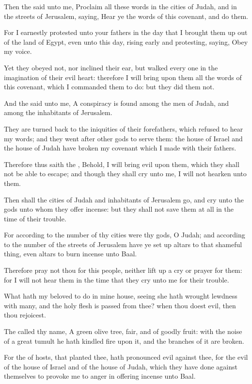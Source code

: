 \Verse Then the \LORD said unto me, Proclaim all these words in the cities of Judah, and in the streets of Jerusalem, saying, Hear ye the words of this covenant, and do them.

\Verse For I earnestly protested unto your fathers in the day that I brought them up out of the land of Egypt, even unto this day, rising early and protesting, saying, Obey my voice.

\Verse Yet they obeyed not, nor inclined their ear, but walked every one in the imagination of their evil heart: therefore I will bring upon them all the words of this covenant, which I commanded them to do: but they did them not.

\Verse And the \LORD said unto me, A conspiracy is found among the men of Judah, and among the inhabitants of Jerusalem.

\Verse They are turned back to the iniquities of their forefathers, which refused to hear my words; and they went after other gods to serve them: the house of Israel and the house of Judah have broken my covenant which I made with their fathers.

\Verse Therefore thus saith the \LORD, Behold, I will bring evil upon them, which they shall not be able to escape; and though they shall cry unto me, I will not hearken unto them.

\Verse Then shall the cities of Judah and inhabitants of Jerusalem go, and cry unto the gods unto whom they offer incense: but they shall not save them at all in the time of their trouble.

\Verse For according to the number of thy cities were thy gods, O Judah; and according to the number of the streets of Jerusalem have ye set up altars to that shameful thing, even altars to burn incense unto Baal.

\Verse Therefore pray not thou for this people, neither lift up a cry or prayer for them: for I will not hear them in the time that they cry unto me for their trouble.

\Verse What hath my beloved to do in mine house, seeing she hath wrought lewdness with many, and the holy flesh is passed from thee?  when thou doest evil, then thou rejoicest.

\Verse The \LORD called thy name, A green olive tree, fair, and of goodly fruit: with the noise of a great tumult he hath kindled fire upon it, and the branches of it are broken.

\Verse For the \LORD of hosts, that planted thee, hath pronounced evil against thee, for the evil of the house of Israel and of the house of Judah, which they have done against themselves to provoke me to anger in offering incense unto Baal.

